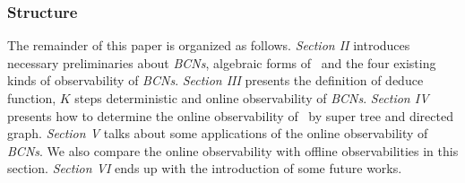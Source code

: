 \subsubsection*{Structure}
The remainder of this paper is organized as follows. {\em Section II} introduces necessary preliminaries about {\em BCNs}, algebraic forms of \BCNs\ and the four existing kinds of observability of {\em BCNs}. {\em Section III} presents the definition of deduce function, $K$ steps deterministic and online observability of {\em BCNs}. {\em Section IV} presents how to determine the online observability of \BCNs\ by super tree and directed graph. {\em Section V} talks about some applications of the online observability of {\em BCNs}. We also compare the online observability with offline observabilities in this section. {\em Section VI} ends up  with the introduction of some future works.


